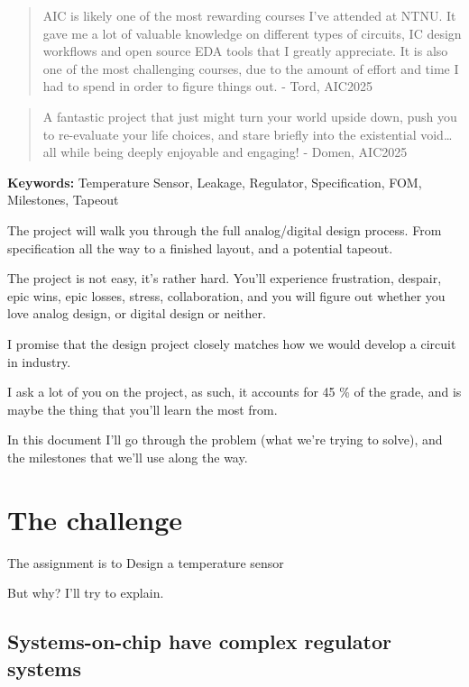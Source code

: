 \begin{quote}
AIC is likely one of the most rewarding courses I've attended at NTNU.
It gave me a lot of valuable knowledge on different types of circuits,
IC design workflows and open source EDA tools that I greatly appreciate.
It is also one of the most challenging courses, due to the amount of
effort and time I had to spend in order to figure things out. - Tord,
AIC2025
\end{quote}

\begin{quote}
A fantastic project that just might turn your world upside down, push
you to re-evaluate your life choices, and stare briefly into the
existential void\ldots{} all while being deeply enjoyable and engaging!
- Domen, AIC2025
\end{quote}

\textbf{Keywords:} Temperature Sensor, Leakage, Regulator,
Specification, FOM, Milestones, Tapeout

The project will walk you through the full analog/digital design
process. From specification all the way to a finished layout, and a
potential tapeout.

The project is not easy, it's rather hard. You'll experience
frustration, despair, epic wins, epic losses, stress, collaboration, and
you will figure out whether you love analog design, or digital design or
neither.

I promise that the design project closely matches how we would develop a
circuit in industry.

I ask a lot of you on the project, as such, it accounts for 45 \% of the
grade, and is maybe the thing that you'll learn the most from.

In this document I'll go through the problem (what we're trying to
solve), and the milestones that we'll use along the way.

\section{The challenge}\label{the-challenge}

The assignment is to Design a temperature sensor

But why? I'll try to explain.

\subsection{Systems-on-chip have complex regulator
systems}\label{systems-on-chip-have-complex-regulator-systems}

